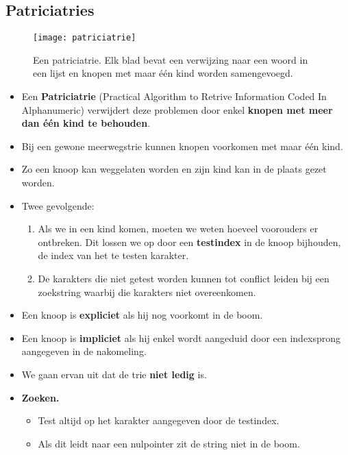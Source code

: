 \subsection{Patriciatries}
\begin{figure}[ht]
    \centering
    \texttt{[image: patriciatrie]}
    \caption{Een patriciatrie. Elk blad bevat een verwijzing naar een woord in een lijst en knopen met maar één kind worden samengevoegd.}
    \label{fig:patriciatrie}
\end{figure}
\begin{itemize}
    \alert Veel trieknopen hebben maar één kind zodat er veel ongebruikt geheugen is.
    \alert Er zijn ook twee soorten knoopen: inwendige knoop zonder sleutel maar met wijzers naar kinderen, en bladeren met sleutel maar zonder wijzers naar kinderen.
    \item Een \textbf{Patriciatrie} (Practical Algorithm to Retrive Information Coded In Alphanumeric) verwijdert deze problemen door enkel \textbf{knopen met meer dan één kind te behouden}.
    \item Bij een gewone meerwegstrie kunnen knopen voorkomen met maar één kind.
    \item Zo een knoop kan weggelaten worden en zijn kind kan in de plaats gezet worden.
    \item Twee gevolgende:
    \begin{enumerate}
        \item Als we in een kind komen, moeten we weten hoeveel voorouders er ontbreken. Dit lossen we op door een \textbf{testindex} in de knoop bijhouden, de index van het te testen karakter.
        \item De karakters die niet getest worden kunnen tot conflict leiden bij een zoekstring waarbij die karakters niet overeenkomen.
    \end{enumerate}
    \item Een knoop is \textbf{expliciet} als hij nog voorkomt in de boom.
    \item Een knoop is \textbf{impliciet} als hij enkel wordt aangeduid door een indexsprong aangegeven in de nakomeling.
    \item We gaan ervan uit dat de trie \textbf{niet ledig} is.
    \item \textbf{Zoeken.}
    \begin{itemize}
        \item Test altijd op het karakter aangegeven door de testindex.
        \item Als dit leidt naar een nulpointer zit de string niet in de boom.

\end{itemize}
\end{itemize}

